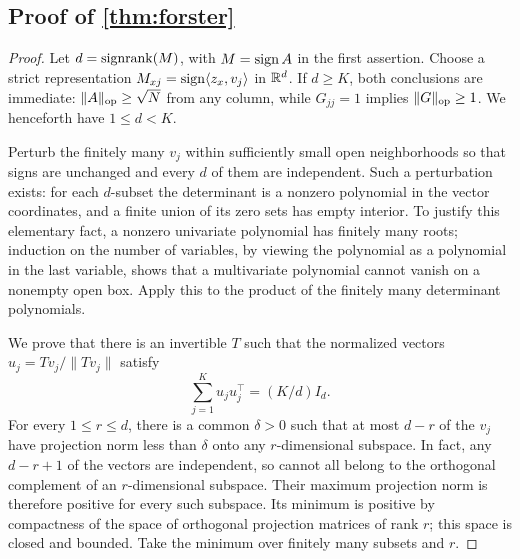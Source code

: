 \subsection[Proof of result forster]{Proof of \cref{thm:forster}}\label{proof:forster}
\begin{proof}
Let $d=\operatorname{signrank}(M)$, with $M=\operatorname{sign} A$ in the first assertion. Choose a strict representation
$M_{xj}=\operatorname{sign}\langle z_x,v_j\rangle$ in $\mathbb R^d$. If $d\geq K$, both conclusions are immediate: $\|A\|_{\mathrm{op}}\geq\sqrt N$ from any column, while $G_{jj}=1$ implies $\|G\|_{\mathrm{op}}\geq1$. We henceforth have $1\leq d<K$.

Perturb the finitely many $v_j$ within sufficiently small open neighborhoods so that signs are unchanged and every $d$ of them are independent. Such a perturbation exists: for each $d$-subset the determinant is a nonzero polynomial in the vector coordinates, and a finite union of its zero sets has empty interior. To justify this elementary fact, a nonzero univariate polynomial has finitely many roots; induction on the number of variables, by viewing the polynomial as a polynomial in the last variable, shows that a multivariate polynomial cannot vanish on a nonempty open box. Apply this to the product of the finitely many determinant polynomials.

We prove that there is an invertible $T$ such that the normalized vectors
$u_j=Tv_j/\|Tv_j\|$ satisfy
\begin{equation}\label{eq:isotropy}
 \sum_{j=1}^K u_ju_j^\top=(K/d)I_d.
\end{equation}
For every $1\leq r\leq d$, there is a common $\delta>0$ such that at most $d-r$ of the $v_j$ have projection norm less than $\delta$ onto any $r$-dimensional subspace. In fact, any $d-r+1$ of the vectors are independent, so cannot all belong to the orthogonal complement of an $r$-dimensional subspace. Their maximum projection norm is therefore positive for every such subspace. Its minimum is positive by compactness of the space of orthogonal projection matrices of rank $r$; this space is closed and bounded. Take the minimum over finitely many subsets and $r$.


\end{proof}
